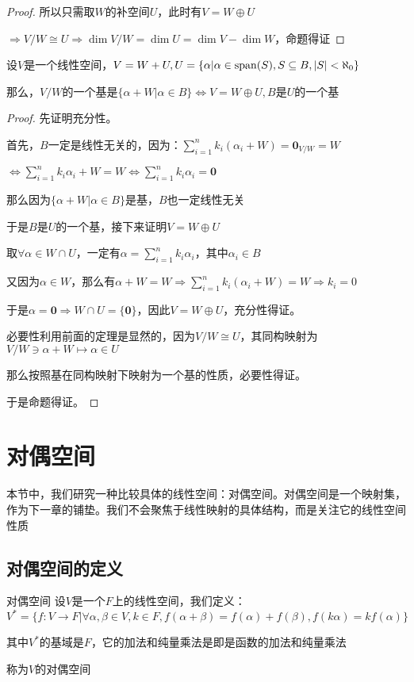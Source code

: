 \documentclass[12pt, a4paper, oneside, UTF8]{ctexbook}
\begin{document}
\begin{para}{0}
\begin{proof}
						所以只需取$W$的补空间$U$，此时有$V=W \oplus U$

						$\Rightarrow V/W \cong U \Rightarrow \dim V/W = \dim U=\dim V-\dim W$，命题得证
					\end{proof}
				\point{}
					\begin{proposition}
						设$V$是一个线性空间，$V=W+U,U = \{\alpha | \alpha \in \operatorname{span}(S),S \subseteq B,|S| < \aleph_0\}$

						那么，$V/W$的一个基是$\{\alpha + W| \alpha \in B\} \Leftrightarrow V=W \oplus U,B$是$U$的一个基
					\end{proposition}
					\begin{proof}
						先证明充分性。

						首先，$B$一定是线性无关的，因为：$\sum\limits_{i=1}^{n} k_i (\alpha_i+ W) = \mathbf{0}_{V/W} = W$

						$\Leftrightarrow \sum\limits_{i=1}^{n} k_i \alpha_i + W = W \Leftrightarrow \sum\limits_{i=1}^{n} k_i \alpha_i = \mathbf{0}$

						那么因为$\{\alpha + W| \alpha \in B\}$是基，$B$也一定线性无关

						于是$B$是$U$的一个基，接下来证明$V=W\oplus U$

						取$\forall \alpha \in W \cap U$，一定有$\alpha = \sum\limits_{i=1}^{n} k_i \alpha_i$，其中$\alpha_i \in B$

						又因为$\alpha \in W$，那么有$\alpha + W = W \Rightarrow \sum\limits_{i=1}^{n} k_i (\alpha_i+ W) = W \Rightarrow k_i = 0$

						于是$\alpha = \mathbf{0} \Rightarrow W \cap U = \{\mathbf{0}\}$，因此$V=W\oplus U$，充分性得证。

						必要性利用前面的定理是显然的，因为$V/W \cong U$，其同构映射为$V/W \ni \alpha + W \mapsto \alpha \in U$

						那么按照基在同构映射下映射为一个基的性质，必要性得证。

						于是命题得证。
					\end{proof}
			\end{para}
	\section{对偶空间}
		本节中，我们研究一种比较具体的线性空间：对偶空间。对偶空间是一个映射集，作为下一章的铺垫。我们不会聚焦于线性映射的具体结构，而是关注它的线性空间性质
		\subsection{对偶空间的定义}
			\begin{defn}{对偶空间}{}
				设$V$是一个$F$上的线性空间，我们定义：
				\begin{equation}
					V^* = \{f:V \to F| \forall \alpha ,\beta \in V,k \in F,f(\alpha +\beta )=f(\alpha )+f(\beta ),f(k\alpha )=kf(\alpha )\}
				\end{equation}

				其中$V^*$的基域是$F$，它的加法和纯量乘法是即是函数的加法和纯量乘法

				称为$V$的对偶空间
			\end{defn}
\end{document}
